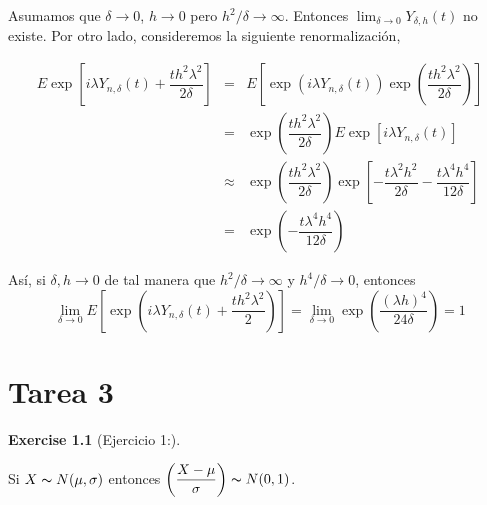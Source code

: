 \documentclass[
  letterpaper,
  DIV=11,
  numbers=noendperiod]{scrreprt}
\theoremstyle{definition}
\newtheorem{exercise}{Exercise}[chapter]
\theoremstyle{plain}
\theoremstyle{remark}
\begin{document}
Asumamos que \(\delta\to0\), \(h\to0\) pero \(h^{2}/\delta\to\infty\).
Entonces \(\lim_{\delta\to0} Y_{\delta, h}(t)\) no existe. Por otro
lado, consideremos la siguiente renormalización,

\begin{eqnarray}
    E\exp\left[i\lambda Y_{n,\delta}\left(t\right)+\dfrac{th^{2}\lambda^{2}}{2\delta}\right] & = & E\left[\exp (i\lambda Y_{n,\delta}\left(t\right))\exp\left(\dfrac{th^{2}\lambda^{2}}{2\delta}\right)\right]\nonumber\\
    & = & \exp\left(\dfrac{th^{2}\lambda^{2}}{2\delta}\right)E\exp\left[ i\lambda Y_{n,\delta}\left(t\right)\right]\nonumber\\
    & \approx & \exp\left(\dfrac{th^{2}\lambda^{2}}{2\delta}\right)\exp\left[-\dfrac{t\lambda^{2} h^{2}}{2\delta}-\dfrac{t\lambda^{4} h^{4}}{12\delta}\right]\nonumber\\
    & = & \exp\left(-\dfrac{t\lambda^{4} h^{4}}{12\delta}\right)
\end{eqnarray}

Así, si \(\delta,h\to0\) de tal manera que \(h^{2}/\delta\to\infty\) y
\(h^{4}/\delta\to0\), entonces \[
\lim_{\delta\to0}E\left[\exp\left(i\lambda Y_{n,\delta}\left(t\right)+\dfrac{th^{2}\lambda^{2}}{2}\right)\right]=\lim_{\delta\to0}\exp\left(\dfrac{\left(\lambda h\right)^{4}}{24\delta}\right)=1
\]


\hypertarget{tarea-3}{%
\chapter{Tarea 3}\label{tarea-3}}

\begin{exercise}[Ejercicio 1:]\protect\hypertarget{exr-1}{}\label{exr-1}

Si \(X\thicksim N(\mu,\sigma)\) entonces
\(\left(\dfrac{X-\mu}{\sigma}\right)\thicksim N(0,1)\).

\end{exercise}
\end{document}
